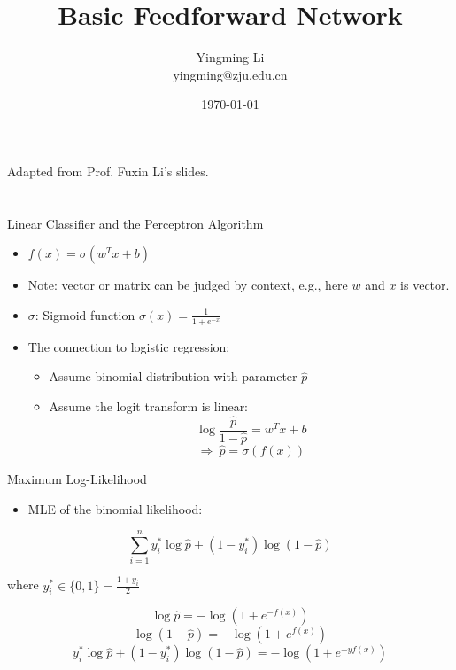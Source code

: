 \documentclass[12pt,notes,mathserif]{beamer}
\title{Basic Feedforward Network}
\author[YingmingLi]{Yingming Li \\ yingming@zju.edu.cn}
\institute[DSERC, ZJU]{Data Science \& Engineering Research Center, ZJU}
\date[\today]{\today}
\providecommand{\tightlist}{%
	\setlength{\itemsep}{0pt}\setlength{\parskip}{0pt}}
\begin{document}

\begin{frame}[c]
	\titlepage
	Adapted from Prof. Fuxin Li's slides. 
\end{frame}

\section{}\label{section}

\begin{frame}{Linear Classifier and the Perceptron Algorithm}

\begin{itemize}
\item
  \(f(x)=\sigma(w^T{x}+b)\)
\item
  Note: vector or matrix can be judged by context, e.g., here \(w\) and
  \(x\) is vector.
\item
  \(\sigma\): Sigmoid function \(\sigma(x)=\frac{1}{1+e^{-x}}\)
\item
  The connection to logistic regression:

  \begin{itemize}
  \tightlist
  \item
    Assume binomial distribution with parameter \(\hat{p}\)
  \item
    Assume the logit transform is linear:
    \[\log\frac{\hat{p}}{1-\hat{p}}=w^{{T}}x+b\]
    \[\Rightarrow\ \hat{p}=\sigma(f(x))\]
  \end{itemize}
\end{itemize}

\end{frame}

\begin{frame}{Maximum Log-Likelihood}

\begin{itemize}
\tightlist
\item
  MLE of the binomial likelihood:
\end{itemize}

\[\sum_{i=1} ^{n} y_i^* \log \hat{p} + (1-{y}_{i}^{*})\log(1-\hat{p})\]

where \({y}_{i}^{*}\in \{0,1\} =\frac{1+y_{i}}{2}\)

\[\log\hat{p}=-\log(1+e^{-f(x)})\] \[\log(1-\hat{p})=-\log(1+e^{f(x)})\]
\[{y}_{{i}}^{*}\log\hat{p}+(1-{y}_{i}^{*})\log(1-\hat{p})=-\log(1+e^{-yf(x)})\]

\end{frame}
\end{document}
